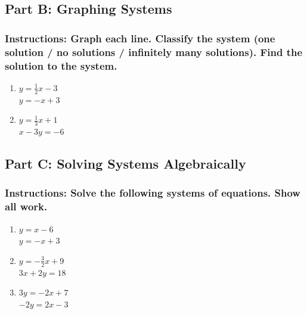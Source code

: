 \documentclass[12pt]{article}
\begin{document}
        \subsection*{Part B: Graphing Systems}
            
            \subsubsection*{Instructions: Graph each line. Classify the system (one solution / no solutions / infinitely many solutions). Find the solution to the system.}

                \begin{enumerate}
                    \item $y = \frac{1}{2}x - 3$\\
                    $y = -x + 3$
                    
                    \item $y = \frac{1}{3}x + 1$\\
                    $x - 3y = -6$
                \end{enumerate}
        
        \subsection*{Part C: Solving Systems Algebraically}
            
            \subsubsection*{Instructions: Solve the following systems of equations. Show all work.}

                \begin{enumerate}
                    \item $y = x - 6$\\
                    $y = -x + 3$
                    
                    \item $y = -\frac{3}{2}x + 9$\\
                    $3x + 2y = 18$
                    
                    \item $3y = -2x + 7$\\
                    $-2y = 2x - 3$
                \end{enumerate}

                \newpage
        
\end{document}
